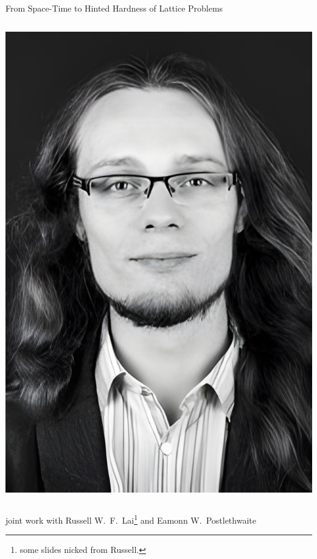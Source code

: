 \documentclass[xcolor=table,10pt,aspectratio=169]{beamer}
\begin{document}
\begin{frame}[label={sec:orgad49e0e}]{From Space-Time to Hinted Hardness of Lattice Problems}
\begin{columns}
\begin{column}{0.5\columnwidth}
\begin{center}
\includegraphics[keepaspectratio,frame,height=0.6\textheight]{./eamonn.jpg}
\end{center}
\end{column}
\end{columns}

\begin{center}
joint work with Russell W. F. Lai\footnote{some slides nicked from Russell.} and Eamonn W. Postlethwaite
\end{center}
\end{frame}
\end{document}
